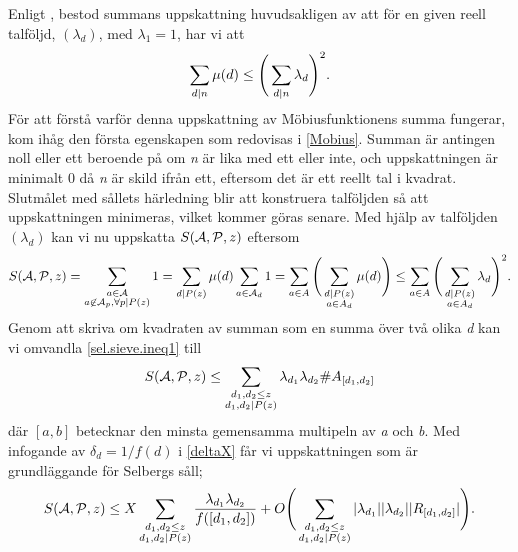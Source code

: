 Enligt \cite{cojocarumurty}, bestod summans uppskattning huvudsakligen av att för en given reell talföljd, \((\lambda_d)\), med \(\lambda_1 = 1\), har vi att 
\begin{equation}
    \sum_{d\divides n}\mu(d) \leq \Bigg(\sum_{d\divides n}\lambda_d\Bigg)^2.\nonumber
\end{equation}
För att förstå varför denna uppskattning av Möbiusfunktionens summa fungerar, kom ihåg den första egenskapen som redovisas i \ref{Mobius}. 
Summan är antingen noll eller ett beroende på om \textit{n} är lika med ett eller inte, och uppskattningen är minimalt 0 då \textit{n} är skild ifrån ett, eftersom det är ett reellt tal i kvadrat.
Slutmålet med sållets härledning blir att konstruera talföljden så att uppskattningen minimeras, vilket kommer göras senare.
Med hjälp av talföljden \((\lambda_d)\) kan vi nu uppskatta \(\S{A}{P}{z}\) eftersom
\begin{equation}
\S{A}{P}{z} = \sum_{\substack{a\in \mathcal{A}\\a\not\in\mathcal{A}_p,\forall p\divides P(z)}} 1 = \sum_{d\divides P(z)} \mu(d) \sum_{a\in\mathcal{A}_d}1 = \sum_{a\in A} \Bigg(\sum_{\substack{d\divides P(z)\\a\in A_d}}\mu(d)\Bigg)\leq \sum_{a\in A}\Bigg(\sum_{\substack{d\divides P(z)\\a\in A_d}}\lambda_d\Bigg)^2.\label{sel.sieve.ineq1}
\end{equation}
Genom att skriva om kvadraten av summan som en summa över två olika \textit{d} kan vi omvandla \eqref{sel.sieve.ineq1} till
\begin{equation}
    \S{A}{P}{z} \leq \sum_{\substack{d_1,d_2\leq z\\d_1,d_2\divides P(z)}}\lambda_{d_1}\lambda_{d_2}\#A_{[d_1, d_2]}\nonumber
\end{equation}
där \([a, b]\) betecknar den minsta gemensamma multipeln av \textit{a} och \textit{b}. 
Med infogande av \(\delta_d = 1/f(d)\) i \eqref{deltaX} får vi uppskattningen som är grundläggande för Selbergs såll;
\begin{equation}
    \S{A}{P}{z} \leq X\sum_{\substack{d_1,d_2\leq z\\d_1,d_2\divides P(z)}}\frac{\lambda_{d_1}\lambda_{d_2}}{f([d_1,d_2])} + O\Bigg(\sum_{\substack{d_1,d_2\leq z\\d_1,d_2\divides P(z)}}|\lambda_{d_1}||\lambda_{d_2}||R_{[d_1, d_2]}|\Bigg)\label{sel.sieve.main}.
\end{equation}

